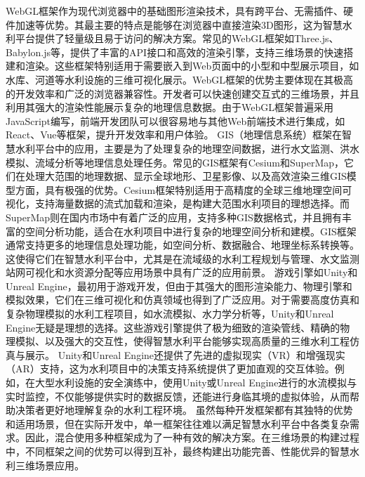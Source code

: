 {{{WebGL框架作为现代浏览器中的基础图形渲染技术，具有跨平台、无需插件、硬件加速等优势。其最主要的特点是能够在浏览器中直接渲染3D图形，这为智慧水利平台提供了轻量级且易于访问的解决方案。常见的WebGL框架如Three.js、Babylon.js等，提供了丰富的API接口和高效的渲染引擎，支持三维场景的快速搭建和渲染。这些框架特别适用于需要嵌入到Web页面中的小型和中型展示项目，如水库、河道等水利设施的三维可视化展示。WebGL框架的优势主要体现在其极高的开发效率和广泛的浏览器兼容性。开发者可以快速创建交互式的三维场景，并且利用其强大的渲染性能展示复杂的地理信息数据。由于WebGL框架普遍采用JavaScript编写，前端开发团队可以很容易地与其他Web前端技术进行集成，如React、Vue等框架，提升开发效率和用户体验。 GIS（地理信息系统）框架在智慧水利平台中的应用，主要是为了处理复杂的地理空间数据，进行水文监测、洪水模拟、流域分析等地理信息处理任务。常见的GIS框架有Cesium和SuperMap，它们在处理大范围的地理数据、显示全球地形、卫星影像、以及高效渲染三维GIS模型方面，具有极强的优势。Cesium框架特别适用于高精度的全球三维地理空间可视化，支持海量数据的流式加载和渲染，是构建大范围水利项目的理想选择。而SuperMap则在国内市场中有着广泛的应用，支持多种GIS数据格式，并且拥有丰富的空间分析功能，适合在水利项目中进行复杂的地理空间分析和建模。GIS框架通常支持更多的地理信息处理功能，如空间分析、数据融合、地理坐标系转换等。这使得它们在智慧水利平台中，尤其是在流域级的水利工程规划与管理、水文监测站网可视化和水资源分配等应用场景中具有广泛的应用前景。 游戏引擎如Unity和Unreal Engine，最初用于游戏开发，但由于其强大的图形渲染能力、物理引擎和模拟效果，它们在三维可视化和仿真领域也得到了广泛应用。对于需要高度仿真和复杂物理模拟的水利工程项目，如水流模拟、水力学分析等，Unity和Unreal Engine无疑是理想的选择。这些游戏引擎提供了极为细致的渲染管线、精确的物理模拟、以及强大的交互性，使得智慧水利平台能够实现高质量的三维水利工程仿真与展示。 Unity和Unreal Engine还提供了先进的虚拟现实（VR）和增强现实（AR）支持，这为水利项目中的决策支持系统提供了更加直观的交互体验。例如，在大型水利设施的安全演练中，使用Unity或Unreal Engine进行的水流模拟与实时监控，不仅能够提供实时的数据反馈，还能进行身临其境的虚拟体验，从而帮助决策者更好地理解复杂的水利工程环境。 虽然每种开发框架都有其独特的优势和适用场景，但在实际开发中，单一框架往往难以满足智慧水利平台中各类复杂需求。因此，混合使用多种框架成为了一种有效的解决方案。在三维场景的构建过程中，不同框架之间的优势可以得到互补，最终构建出功能完善、性能优异的智慧水利三维场景应用。 }}}
